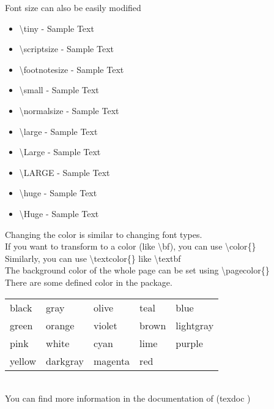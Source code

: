 \documentclass{beamer}
\newcommand{\samplecolorbox}[1]{\fcolorbox{black}{#1}{\color{#1}{\tiny{\phantom{0000}}}} \small{#1}}
\begin{document}
\begin{frame}
	Font size can also be easily modified
	\begin{itemize}
		\item \alert{\textbackslash tiny} - \tiny{Sample Text}
		\item \alert{\textbackslash scriptsize} - \scriptsize{Sample Text}
		\item \alert{\textbackslash footnotesize} - \footnotesize{Sample Text}
		\item \alert{\textbackslash small} - \small{Sample Text}
		\item \alert{\textbackslash normalsize} - \normalsize{Sample Text}
		\item \alert{\textbackslash large} - \large{Sample Text}
		\item \alert{\textbackslash Large} - \Large{Sample Text}
		\item \alert{\textbackslash LARGE} - \LARGE{Sample Text}
		\item \alert{\textbackslash huge} - \huge{Sample Text}
		\item \alert{\textbackslash Huge} - \Huge{Sample Text}
	\end{itemize}
\end{frame}

\begin{frame}
	Changing the color is similar to changing font types.\\[0.5em]
	If you want to transform to a color (like \alert{\textbackslash bf}), you can use \alert{\textbackslash color}\{\}\\
	Similarly, you can use \alert{\textbackslash textcolor}\{\} like \alert{\textbackslash textbf}\\
	The background color of the whole page can be set using \alert{\textbackslash pagecolor}\{\}\\[0.5em]
	There are some defined color  in the  package.\\[0.5em]
	\begin{tabular}{lllll}
	\samplecolorbox{black}&\samplecolorbox{gray}&\samplecolorbox{olive}&\samplecolorbox{teal}&\samplecolorbox{blue}\\
	\samplecolorbox{green}&\samplecolorbox{orange}&\samplecolorbox{violet}&\samplecolorbox{brown}&\samplecolorbox{lightgray}\\
	\samplecolorbox{pink}&\samplecolorbox{white}&\samplecolorbox{cyan}&\samplecolorbox{lime}&\samplecolorbox{purple}\\
	\samplecolorbox{yellow}&\samplecolorbox{darkgray}&\samplecolorbox{magenta}&\samplecolorbox{red}\\
	\end{tabular}		
	\\[0.5em]
	You can find more information in the documentation of  (\alert{texdoc} )
\end{frame}
\end{document}
